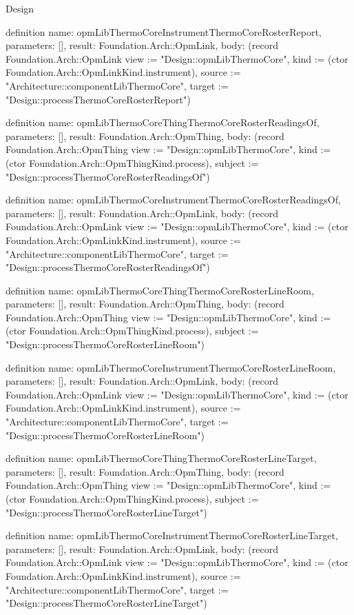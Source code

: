 \begin{lexlean}{Design}
\begin{semanticmodule}
definition{
  name: opmLibThermoCoreInstrumentThermoCoreRosterReport,
  parameters: [],
  result: Foundation.Arch::OpmLink,
  body: (record Foundation.Arch::OpmLink {view := "Design::opmLibThermoCore", kind := (ctor Foundation.Arch::OpmLinkKind.instrument), source := "Architecture::componentLibThermoCore", target := "Design::processThermoCoreRosterReport"})
}

definition{
  name: opmLibThermoCoreThingThermoCoreRosterReadingsOf,
  parameters: [],
  result: Foundation.Arch::OpmThing,
  body: (record Foundation.Arch::OpmThing {view := "Design::opmLibThermoCore", kind := (ctor Foundation.Arch::OpmThingKind.process), subject := "Design::processThermoCoreRosterReadingsOf"})
}

definition{
  name: opmLibThermoCoreInstrumentThermoCoreRosterReadingsOf,
  parameters: [],
  result: Foundation.Arch::OpmLink,
  body: (record Foundation.Arch::OpmLink {view := "Design::opmLibThermoCore", kind := (ctor Foundation.Arch::OpmLinkKind.instrument), source := "Architecture::componentLibThermoCore", target := "Design::processThermoCoreRosterReadingsOf"})
}

definition{
  name: opmLibThermoCoreThingThermoCoreRosterLineRoom,
  parameters: [],
  result: Foundation.Arch::OpmThing,
  body: (record Foundation.Arch::OpmThing {view := "Design::opmLibThermoCore", kind := (ctor Foundation.Arch::OpmThingKind.process), subject := "Design::processThermoCoreRosterLineRoom"})
}

definition{
  name: opmLibThermoCoreInstrumentThermoCoreRosterLineRoom,
  parameters: [],
  result: Foundation.Arch::OpmLink,
  body: (record Foundation.Arch::OpmLink {view := "Design::opmLibThermoCore", kind := (ctor Foundation.Arch::OpmLinkKind.instrument), source := "Architecture::componentLibThermoCore", target := "Design::processThermoCoreRosterLineRoom"})
}

definition{
  name: opmLibThermoCoreThingThermoCoreRosterLineTarget,
  parameters: [],
  result: Foundation.Arch::OpmThing,
  body: (record Foundation.Arch::OpmThing {view := "Design::opmLibThermoCore", kind := (ctor Foundation.Arch::OpmThingKind.process), subject := "Design::processThermoCoreRosterLineTarget"})
}

definition{
  name: opmLibThermoCoreInstrumentThermoCoreRosterLineTarget,
  parameters: [],
  result: Foundation.Arch::OpmLink,
  body: (record Foundation.Arch::OpmLink {view := "Design::opmLibThermoCore", kind := (ctor Foundation.Arch::OpmLinkKind.instrument), source := "Architecture::componentLibThermoCore", target := "Design::processThermoCoreRosterLineTarget"})
}


\end{semanticmodule}
\end{lexlean}
